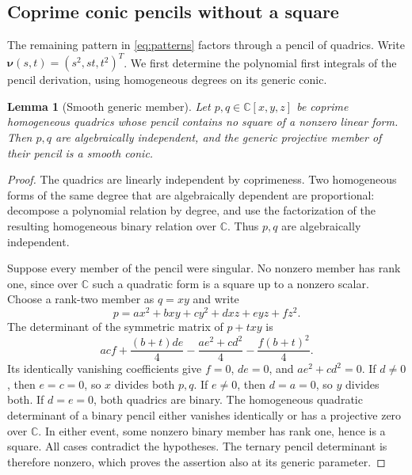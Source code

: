 \documentclass[11pt,reqno]{amsart}
\numberwithin{equation}{section}
\theoremstyle{plain}
\newtheorem{lemma}[theorem]{Lemma}
\theoremstyle{definition}
\theoremstyle{remark}
\newcommand{\C}{\mathbb C}
\newcommand{\nuu}{\boldsymbol\nu}
\begin{document}
\subsection{Coprime conic pencils without a square}\label{sec:nonsquare}
The remaining pattern in \eqref{eq:patterns} factors through a pencil of
quadrics. Write $\nuu(s,t)=(s^2,st,t^2)^T$. We first determine the polynomial
first integrals of the pencil derivation, using homogeneous degrees on its
generic conic.

\begin{lemma}[Smooth generic member]\label{lem:smooth-generic-conic}
Let $p,q\in\C[x,y,z]$ be coprime homogeneous quadrics whose pencil contains no square of a nonzero linear form. Then $p,q$ are algebraically independent, and the generic projective member of their pencil is a smooth conic.
\end{lemma}
\begin{proof}
The quadrics are linearly independent by coprimeness. Two homogeneous forms of the same degree that are algebraically dependent are proportional: decompose a polynomial relation by degree, and use the factorization of the resulting homogeneous binary relation over $\C$. Thus $p,q$ are algebraically independent.

Suppose every member of the pencil were singular. No nonzero member has rank one, since over $\C$ such a quadratic form is a square up to a nonzero scalar. Choose a rank-two member as $q=xy$ and write
\[
p=ax^2+bxy+cy^2+dxz+eyz+fz^2.
\]
The determinant of the symmetric matrix of $p+txy$ is
\[
acf+\frac{(b+t)de}{4}-\frac{ae^2+cd^2}{4}
       -\frac{f(b+t)^2}{4}.
\]
Its identically vanishing coefficients give $f=0$, $de=0$, and $ae^2+cd^2=0$. If $d\ne0$, then $e=c=0$, so $x$ divides both $p,q$. If $e\ne0$, then $d=a=0$, so $y$ divides both. If $d=e=0$, both quadrics are binary. The homogeneous quadratic determinant of a binary pencil either vanishes identically or has a projective zero over $\C$. In either event, some nonzero binary member has rank one, hence is a square. All cases contradict the hypotheses. The ternary pencil determinant is therefore nonzero, which proves the assertion also at its generic parameter.
\end{proof}
\end{document}
